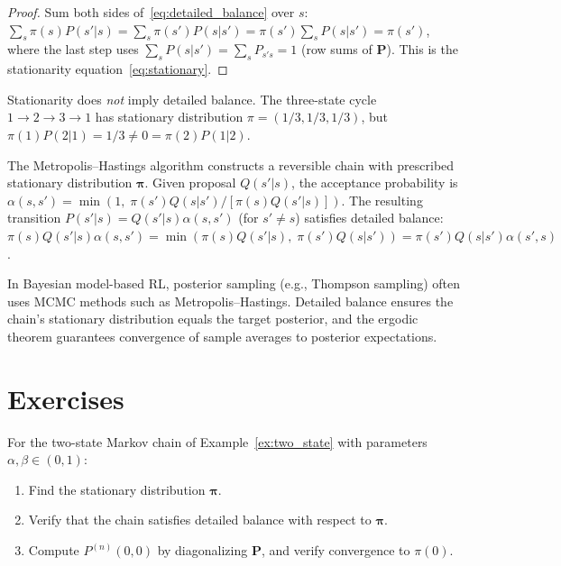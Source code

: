 \documentclass[11pt,a4paper]{article}
\begin{document}
\begin{proof}
Sum both sides of~\eqref{eq:detailed_balance} over $s$:
$\sum_s \pi(s) P(s'|s) = \sum_s \pi(s') P(s|s')
= \pi(s') \sum_s P(s|s') = \pi(s')$,
where the last step uses $\sum_s P(s|s') = \sum_s P_{s's} = 1$
(row sums of $\mathbf{P}$).  This is the stationarity
equation~\eqref{eq:stationary}.
\end{proof}

\begin{remark}
Stationarity does \emph{not} imply detailed balance.  The
three-state cycle $1 \to 2 \to 3 \to 1$ has stationary
distribution $\pi = (1/3, 1/3, 1/3)$, but
$\pi(1) P(2|1) = 1/3 \neq 0 = \pi(2) P(1|2)$.
\end{remark}

\begin{example}
\label{ex:mh}
The Metropolis--Hastings algorithm constructs a reversible chain
with prescribed stationary distribution $\boldsymbol{\pi}$.
Given proposal $Q(s'|s)$, the acceptance probability is
$\alpha(s, s') = \min(1,\;
\pi(s') Q(s|s') / [\pi(s) Q(s'|s)])$.
The resulting transition $P(s'|s) = Q(s'|s) \alpha(s, s')$
(for $s' \neq s$) satisfies detailed balance:
$\pi(s) Q(s'|s) \alpha(s, s')
= \min(\pi(s) Q(s'|s),\; \pi(s') Q(s|s'))
= \pi(s') Q(s|s') \alpha(s', s)$.
\end{example}

\begin{rlconnection}[title={MCMC in Model-Based RL}]
In Bayesian model-based RL, posterior sampling (e.g., Thompson
sampling) often uses MCMC methods such as Metropolis--Hastings.
Detailed balance ensures the chain's stationary distribution
equals the target posterior, and the ergodic theorem guarantees
convergence of sample averages to posterior expectations.
\end{rlconnection}


\section{Exercises}
\label{sec:exercises}

\begin{exercise}[(*)]
\label{ex:two_state_stationary}
For the two-state Markov chain of Example~\ref{ex:two_state}
with parameters $\alpha, \beta \in (0,1)$:
\begin{enumerate}[label=(\alph*)]
  \item Find the stationary distribution $\boldsymbol{\pi}$.
  \item Verify that the chain satisfies detailed balance with
    respect to $\boldsymbol{\pi}$.
  \item Compute $P^{(n)}(0, 0)$ by diagonalizing $\mathbf{P}$,
    and verify convergence to $\pi(0)$.
\end{enumerate}
\end{exercise}
\end{document}
